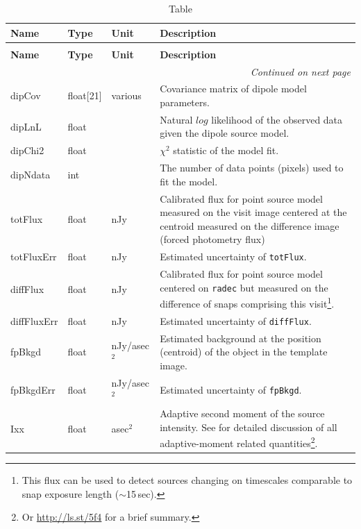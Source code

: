 \documentclass[SE,lsstdraft,toc]{lsstdoc}
\newenvironment{schema}[3]{%
\setlength\LTleft{0pt}
\setlength\LTright{\fill}
\begin{longtable}{p{0.2\textwidth}p{0.14\textwidth}p{0.14\textwidth}p{0.41\textwidth}}

\caption[#1]{#2\label{#3}}\\

\hline \textbf{Name} & \textbf{Type} & \textbf{Unit} & \textbf{Description}\\ \hline
\endfirsthead

\caption[#1]{#2}\\

\hline \textbf{Name} & \textbf{Type} & \textbf{Unit} & \textbf{Description}\\ \hline
\endhead

\hline \multicolumn{4}{r}{\emph{Continued on next page}} \\
\endfoot

\hline\hline
\endlastfoot
}{%
\hline
\end{longtable}
}
\begin{document}
\begin{schema}{\DIASource Table}{\DIASource Table}{tbl:diasourceTable}
dipCov & float[21] & various & Covariance matrix of dipole model parameters. \\

dipLnL & float & ~ & Natural $log$ likelihood of the observed data given the dipole source model. \\

dipChi2 & float & ~ & $\chi^2$ statistic of the model fit. \\

dipNdata & int & ~ & The number of data points (pixels) used to fit the model. \\

totFlux & float & nJy & Calibrated flux for point source model measured on the visit image centered at the centroid measured on the difference image (forced photometry flux) \\

totFluxErr & float & nJy & Estimated uncertainty of \texttt{totFlux}. \\

diffFlux & float & nJy & Calibrated flux for point source model centered on \texttt{radec} but measured on the difference of snaps comprising this visit\footnote{This flux can be used to detect sources changing on timescales comparable to snap exposure length ($\sim$15\,sec).}. \\

diffFluxErr & float & nJy & Estimated uncertainty of \texttt{diffFlux}. \\

fpBkgd & float & nJy/asec$^{2}$ & Estimated background at the position (centroid) of the object in
the template image. \\

fpBkgdErr & float & nJy/asec$^{2}$ & Estimated uncertainty of \texttt{fpBkgd}. \\



Ixx & float & asec$^{2}$  & Adaptive second moment of the source intensity. See \citet{2002AJ....123..583B} for detailed discussion of all adaptive-moment related quantities\footnote{Or \url{http://ls.st/5f4} for a brief summary.}. \\


\end{schema}
\end{document}
